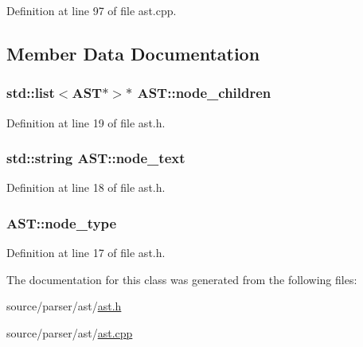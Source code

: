 Definition at line 97 of file ast.\-cpp.



\subsection{Member Data Documentation}
\hypertarget{class_a_s_t_acb9265830632be3a68812c66c08c8752}{
\subsubsection[{node\-\_\-children}]{\setlength{\rightskip}{0pt plus 5cm}std\-::list$<${\bf A\-S\-T}$\ast$$>$$\ast$ A\-S\-T\-::node\-\_\-children\hspace{0.3cm}{\ttfamily [protected]}}}\label{class_a_s_t_acb9265830632be3a68812c66c08c8752}


Definition at line 19 of file ast.\-h.

\hypertarget{class_a_s_t_a1638e0900cea081df5bb23d76432a2c3}{
\subsubsection[{node\-\_\-text}]{\setlength{\rightskip}{0pt plus 5cm}std\-::string A\-S\-T\-::node\-\_\-text\hspace{0.3cm}{\ttfamily [protected]}}}\label{class_a_s_t_a1638e0900cea081df5bb23d76432a2c3}


Definition at line 18 of file ast.\-h.

\hypertarget{class_a_s_t_aa650b2056cd9f76cc9b8833ca5faf312}{
\subsubsection[{node\-\_\-type}]{ A\-S\-T\-::node\-\_\-type\hspace{0.3cm}{\ttfamily [protected]}}}\label{class_a_s_t_aa650b2056cd9f76cc9b8833ca5faf312}


Definition at line 17 of file ast.\-h.



The documentation for this class was generated from the following files\-:\begin{DoxyCompactItemize}
\item 
source/parser/ast/\hyperlink{ast_8h}{ast.\-h}\item 
source/parser/ast/\hyperlink{ast_8cpp}{ast.\-cpp}\end{DoxyCompactItemize}
